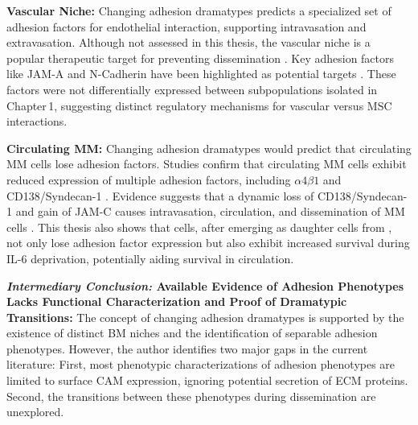 \textbf{Vascular Niche:}
Changing adhesion dramatypes predicts a specialized set of adhesion factors for
endothelial interaction, supporting intravasation and extravasation. Although
not assessed in this thesis, the vascular niche is a popular therapeutic target
for preventing dissemination \cite{neriTargetingAdhesionMolecules2012}. Key
adhesion factors like JAM-A and N-Cadherin have been highlighted as potential
targets \cite{solimandoHaltingViciousCycle2020,
      mrozikTherapeuticTargetingNcadherin2015}. These factors were not differentially
expressed between subpopulations isolated in Chapter\,1, suggesting distinct
regulatory mechanisms for vascular versus \ac{MSC} interactions.


\textbf{Circulating MM:}
Changing adhesion dramatypes would predict that circulating MM cells lose adhesion
factors. Studies confirm that  circulating
\ac{MM} cells exhibit reduced expression%
%
of multiple adhesion factors, including $\alpha4\beta1$ and CD138/Syndecan-1
\cite{paivaDetailedCharacterizationMultiple2013,
      paivaCompetitionClonalPlasma2011, akhmetzyanovaDynamicCD138Surface2020}.
Evidence suggests that a dynamic loss of CD138/Syndecan-1 and gain of JAM-C
causes intravasation, circulation, and dissemination of MM cells
\cite{akhmetzyanovaDynamicCD138Surface2020,
      brandlJunctionalAdhesionMolecule2022}. This thesis also shows that \nMAina
cells, after emerging as daughter cells from \MAina, not only lose adhesion
factor expression but also exhibit increased survival during IL-6 deprivation,
potentially aiding survival in circulation.


\textbf{\textit{Intermediary Conclusion:} Available Evidence of Adhesion
      Phenotypes Lacks Functional Characterization and Proof of Dramatypic
      Transitions:} The concept of changing adhesion dramatypes is supported by the
existence of distinct BM niches and the identification of separable adhesion
phenotypes. However, the author identifies two major gaps in the current
literature: First, most phenotypic characterizations of adhesion phenotypes are
limited to surface \ac{CAM} expression, ignoring potential secretion of \ac{ECM}
proteins. Second, the transitions between these phenotypes during dissemination
are unexplored.

